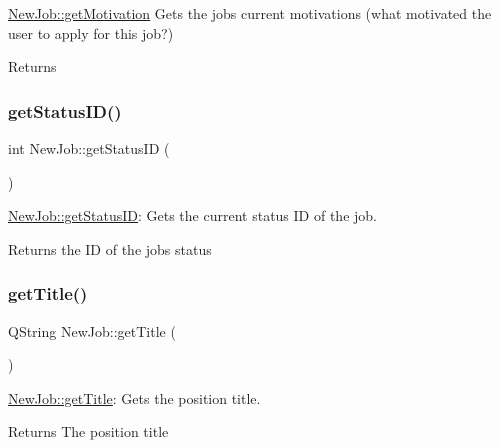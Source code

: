 \mbox{\hyperlink{class_new_job_a665113a114684439ed3705c8c5f8eabf}{New\+Job\+::get\+Motivation}} Gets the job\textquotesingle{}s current motivations (what motivated the user to apply for this job?) 

\begin{DoxyReturn}{Returns}

\end{DoxyReturn}
\mbox{\label{class_new_job_aebbe015a22f5dbf60a34c33dd5c5a8e7}} 
\subsubsection{\texorpdfstring{get\+Status\+I\+D()}{getStatusID()}}
{\footnotesize\ttfamily int New\+Job\+::get\+Status\+ID (\begin{DoxyParamCaption}{ }\end{DoxyParamCaption})}



\mbox{\hyperlink{class_new_job_aebbe015a22f5dbf60a34c33dd5c5a8e7}{New\+Job\+::get\+Status\+ID}}\+: Gets the current status ID of the job. 

\begin{DoxyReturn}{Returns}
the ID of the job\textquotesingle{}s status 
\end{DoxyReturn}
\mbox{\label{class_new_job_aa93c07712d80644b828994a01993c27c}} 
\subsubsection{\texorpdfstring{get\+Title()}{getTitle()}}
{\footnotesize\ttfamily Q\+String New\+Job\+::get\+Title (\begin{DoxyParamCaption}{ }\end{DoxyParamCaption})}



\mbox{\hyperlink{class_new_job_aa93c07712d80644b828994a01993c27c}{New\+Job\+::get\+Title}}\+: Gets the position title. 

\begin{DoxyReturn}{Returns}
The position title 
\end{DoxyReturn}
\mbox{\label{class_new_job_ab5b021c928c289b77b726cc418d194de}} 
